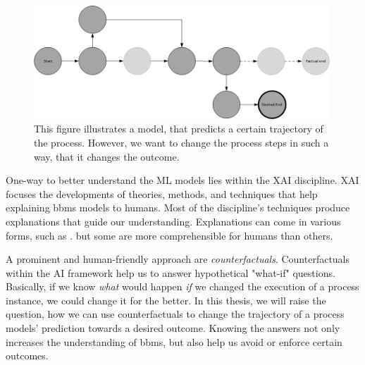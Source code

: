 \documentclass[./../../paper.tex]{subfiles}
\begin{document}
\begin{figure}[htb]
    \centering
    \includegraphics[width=0.99\textwidth]{figures/counterfactual_goal.png}
    \caption{This figure illustrates a model, that predicts a certain trajectory of the process. However, we want to change the process steps in such a way, that it changes the outcome.}
    \label{fig:desired_outcome}
\end{figure}

\noindent One-way to better understand the \gls{ML} models lies within the \gls{XAI} discipline. XAI focuses the developments of theories, methods, and techniques that help explaining \glspl{bbm} models to humans. Most of the discipline's techniques produce explanations that guide our understanding. Explanations can come in various forms, such as \needscite{}. but some are more comprehensible for humans than others. 

A prominent and human-friendly approach are \emph{counterfactuals}\needscite{}. Counterfactuals within the AI framework help us to answer hypothetical "what-if" questions. Basically, if we know \emph{what} would happen \emph{if} we changed the execution of a process instance, we could change it for the better. In this thesis, we will raise the question, how we can use counterfactuals to change the trajectory of a process models' prediction towards a desired outcome. Knowing the answers not only increases the understanding of \glspl{bbm}, but also help us avoid or enforce certain outcomes. 
\end{document}
